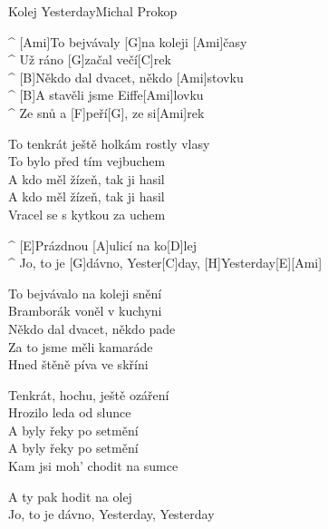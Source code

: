 \begin{song}{Kolej Yesterday}{Michal Prokop}

\begin{guitar}
^ [Ami]To bejvávaly [G]na koleji [Ami]časy\\
^ Už ráno [G]začal večí[C]rek\\
^ [B]Někdo dal dvacet, někdo [Ami]stovku\\
^ [B]A stavěli jsme Eiffe[Ami]lovku\\
^ Ze snů a  [F]peří[G], ze si[Ami]rek\\
\end{guitar}

\begin{guitar}
To tenkrát ještě holkám rostly vlasy\\
To bylo před tím vejbuchem\\
A kdo měl žízeň, tak ji hasil\\
A kdo měl žízeň, tak ji hasil\\
Vracel se s kytkou za uchem\\
\end{guitar}

\begin{guitar}
^ [E]Prázdnou [A]ulicí na ko[D]lej\\
^ Jo, to je [G]dávno, Yester[C]day, [H]Yesterday[E][Ami]\\
\end{guitar}

\begin{guitar}
To bejvávalo na koleji snění\\
Bramborák voněl v kuchyni\\
Někdo dal dvacet, někdo pade\\
Za to jsme měli kamaráde\\
Hned štěně píva ve skříni\\
\end{guitar}

\begin{guitar}
Tenkrát, hochu, ještě ozáření\\
Hrozilo leda od slunce\\
A byly řeky po setmění\\
A byly řeky po setmění\\
Kam jsi moh' chodit na sumce\\
\end{guitar}

\begin{guitar}
A ty pak hodit na olej\\
Jo, to je dávno, Yesterday, Yesterday\\
\end{guitar}


\end{song}
